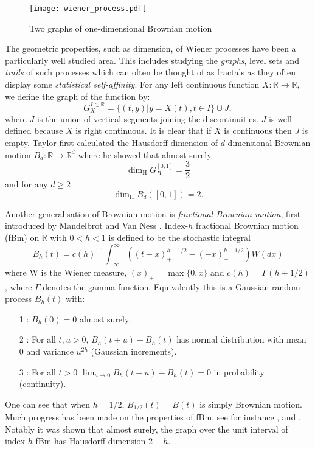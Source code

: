 \begin{figure}[h]
	\texttt{[image: wiener\_process.pdf]}
	\caption{\label{fig:brownianmotion}Two graphs of one-dimensional Brownian motion}
\end{figure}

The geometric properties, such as dimension, of Wiener processes have been a particularly well studied area. This includes studying the \emph{graphs}, level sets and \emph{trails} of such processes which can often be thought of as fractals as they often display some \emph{statistical self-affinity}. For any left continuous function $X:\mathbb{R}\to\mathbb{R}$, we define the graph of the function by:
\[
G^{I\subset\mathbb{R}}_{X}=\{(t,y)|y=X(t),t\in I\}\cup J,
\]
where $J$ is the union of vertical segments joining the discontinuities. $J$ is well defined because $X$ is right continuous. It is clear that if $X$ is continuous then $J$ is empty. Taylor \cite{Ta} first calculated the Hausdorff dimension of $d$-dimensional Brownian motion $B_d:\mathbb{R}\to\mathbb{R}^d$ where he showed that almost surely
\[
\dim_\text{H} G_{B_1}^{[0,1]} =  \frac{3}{2}         
\]
and for any $d\ge 2$
\[
\dim_\text{H} B_d([0,1]) =  2.
\]

Another generalisation of Brownian motion is \emph{fractional Brownian motion}, first introduced by Mandelbrot and Van Ness \cite{MVN}. Index-$h$ fractional Brownian motion (fBm) on $\mathbb{R}$ with $0<h<1$ is defined to be the stochastic integral 
\[
B_h (t) = c(h)^{-1} \int_{-\infty}^\infty \left(\left( t-x \right)_+^{h-1/2} - (-x)_+^{h-1/2} \right)W(dx)
\]
where W is the Wiener measure, $(x)_+ = \max\{0,x\}$ and $c(h) = \Gamma(h+1/2)$, where $\Gamma$ denotes the gamma function. Equivalently this is a Gaussian random process $B_h(t)$ with:
\begin{itemize}
	\item[1]: $B_h(0)=0$ almost surely.
	\item[2]: For all $t,u>0$, $B_h(t+u)-B_h(t)$ has normal distribution with mean 0 and variance $u^{2h}$ (Gaussian increments).
	\item[3]: For all $t>0$ $\lim_{u\to 0} B_h(t+u)-B_h(t)=0$ in probability (continuity).
\end{itemize}
One can see that when $h=1/2$, $B_{1/2}(t) = B(t)$ is simply Brownian motion. Much progress has been made on the properties of fBm, see for instance \cite{Ad},\cite{Ka} and \cite{Fa2}. Notably it was shown that almost surely, the graph over the unit interval of index-$h$ fBm has Hausdorff dimension $2-h$. 

